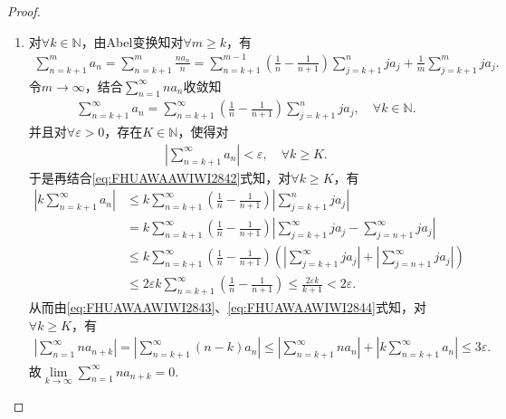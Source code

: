 \documentclass[../../main.tex]{subfiles}%
\begin{document}
\begin{proof}
\begin{enumerate}[(1)]
\item 对$\forall k\in \mathbb{N}$，由Abel变换知对$\forall m\geqslant k$，有
\begin{align*}
\sum\limits_{n=k+1}^{m} a_n = \sum\limits_{n=k+1}^{m} \frac{n a_n}{n} = \sum\limits_{n=k+1}^{m-1} \left( \frac{1}{n} - \frac{1}{n+1} \right) \sum\limits_{j=k+1}^{n} j a_j + \frac{1}{m} \sum\limits_{j=k+1}^{m} j a_j.
\end{align*}
令$m\to\infty$，结合$\sum\limits_{n=1}^{\infty} n a_n$收敛知
\begin{align}
\sum\limits_{n=k+1}^{\infty} a_n = \sum\limits_{n=k+1}^{\infty} \left( \frac{1}{n} - \frac{1}{n+1} \right) \sum\limits_{j=k+1}^{n} j a_j,\quad \forall k\in \mathbb{N}.
\label{eq:FHUAWAAWIWI2842}
\end{align}
并且对$\forall \varepsilon >0$，存在$K\in \mathbb{N}$，使得对
\begin{align}
\left| \sum\limits_{n=k+1}^{\infty} a_n \right| < \varepsilon,\quad \forall k\geqslant K.
\label{eq:FHUAWAAWIWI2843}
\end{align}
于是再结合\eqref{eq:FHUAWAAWIWI2842}式知，对$\forall k\geqslant K$，有
\begin{align}
\left| k \sum\limits_{n=k+1}^{\infty} a_n \right|
&\leqslant k \sum\limits_{n=k+1}^{\infty} \left( \frac{1}{n} - \frac{1}{n+1} \right) \left| \sum\limits_{j=k+1}^{n} j a_j \right| \nonumber\\
&= k \sum\limits_{n=k+1}^{\infty} \left( \frac{1}{n} - \frac{1}{n+1} \right) \left| \sum\limits_{j=k+1}^{\infty} j a_j - \sum\limits_{j=n+1}^{\infty} j a_j \right| \nonumber\\
&\leqslant k \sum\limits_{n=k+1}^{\infty} \left( \frac{1}{n} - \frac{1}{n+1} \right) \left( \left| \sum\limits_{j=k+1}^{\infty} j a_j \right| + \left| \sum\limits_{j=n+1}^{\infty} j a_j \right| \right) \nonumber\\
&\leqslant 2\varepsilon k \sum\limits_{n=k+1}^{\infty} \left( \frac{1}{n} - \frac{1}{n+1} \right) \leqslant \frac{2\varepsilon k}{k+1} < 2\varepsilon.
\label{eq:FHUAWAAWIWI2844}
\end{align}
从而由\eqref{eq:FHUAWAAWIWI2843}、\eqref{eq:FHUAWAAWIWI2844}式知，对$\forall k\geqslant K$，有
\begin{align*}
\left| \sum\limits_{n=1}^{\infty} n a_{n+k} \right| = \left| \sum\limits_{n=k+1}^{\infty} (n-k) a_n \right| \leqslant \left| \sum\limits_{n=k+1}^{\infty} n a_n \right| + \left| k \sum\limits_{n=k+1}^{\infty} a_n \right| \leqslant 3\varepsilon.
\end{align*}
故$\lim\limits_{k\to\infty} \sum\limits_{n=1}^{\infty} n a_{n+k} = 0$.
\end{enumerate}
\end{proof}
\end{document}
